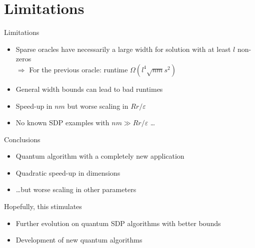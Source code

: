 \section{Limitations}

\begin{frame}{Limitations}
 
 \begin{itemize}
  \item Sparse oracles have necessarily a large width for solution with at least $l$ non-zeros \\ $\Rightarrow$ For the previous oracle: runtime $\Omega( l^4 \sqrt{nm} s^2)$
  \item General width bounds can lead to bad runtimes 
 \end{itemize}
 
 \vspace{2\floatsep}
 
 \begin{itemize}
  \item Speed-up in $nm$ but worse scaling in  $Rr/\varepsilon$
  \item No known SDP examples with $nm \gg  Rr/\varepsilon$ \dots
 \end{itemize}


\end{frame}

\begin{frame}{Conclusions}

\begin{itemize}
 \item Quantum algorithm with a completely new application
 \item Quadratic speed-up in dimensions
 \item \dots but worse scaling in other parameters
\end{itemize}

\vspace{\floatsep}

Hopefully, this stimulates 
\begin{itemize}
 \item Further evolution on quantum SDP algorithms with better bounds
 \item Development of new quantum algorithms
\end{itemize}



\end{frame}
